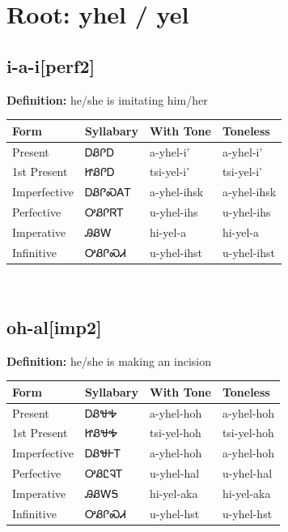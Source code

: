 \documentclass{article}%
\begin{document}
%
\normalsize%
\section*{Root: yhel / yel}%
\subsection*{i-a-i[perf2]}%
\textbf{Definition: }%
he/she is imitating him/her%
\\[0.5em]%
\begin{tabular}{|l|l|l|l|}%
\hline%
\textbf{Form}&\textbf{Syllabary}&\textbf{With Tone}&\textbf{Toneless}\\%
\hline%
Present&ᎠᏰᎵᎠ&a{-}yhel{-}i'&a{-}yhel{-}i'\\%
1st Present&ᏥᏰᎵᎠ&tsi{-}yel{-}i'&tsi{-}yel{-}i'\\%
Imperfective&ᎠᏰᎵᏍᎪᎢ&a{-}yhel{-}ihsk&a{-}yhel{-}ihsk\\%
Perfective&ᎤᏰᎵᏒᎢ&u{-}yhel{-}ihs&u{-}yhel{-}ihs\\%
Imperative&ᎯᏰᎳ&hi{-}yel{-}a&hi{-}yel{-}a\\%
Infinitive&ᎤᏰᎵᏍᏗ&u{-}yhel{-}ihst&u{-}yhel{-}ihst\\%
\hline%
\end{tabular}%
\\[1em]%
\subsection*{oh-al[imp2]}%
\textbf{Definition: }%
he/she is making an incision%
\\[0.5em]%
\begin{tabular}{|l|l|l|l|}%
\hline%
\textbf{Form}&\textbf{Syllabary}&\textbf{With Tone}&\textbf{Toneless}\\%
\hline%
Present&ᎠᏰᏠᎭ&a{-}yhel{-}hoh&a{-}yhel{-}hoh\\%
1st Present&ᏥᏰᏠᎭ&tsi{-}yel{-}hoh&tsi{-}yel{-}hoh\\%
Imperfective&ᎠᏰᏠᎰᎢ&a{-}yhel{-}hoh&a{-}yhel{-}hoh\\%
Perfective&ᎤᏰᏝᎸᎢ&u{-}yhel{-}hal&u{-}yhel{-}hal\\%
Imperative&ᎯᏰᎳᎦ&hi{-}yel{-}aka&hi{-}yel{-}aka\\%
Infinitive&ᎤᏰᎵᏍᏗ&u{-}yhel{-}hst&u{-}yhel{-}hst\\%
\hline%
\end{tabular}%
\\[1em]%
\end{document}
